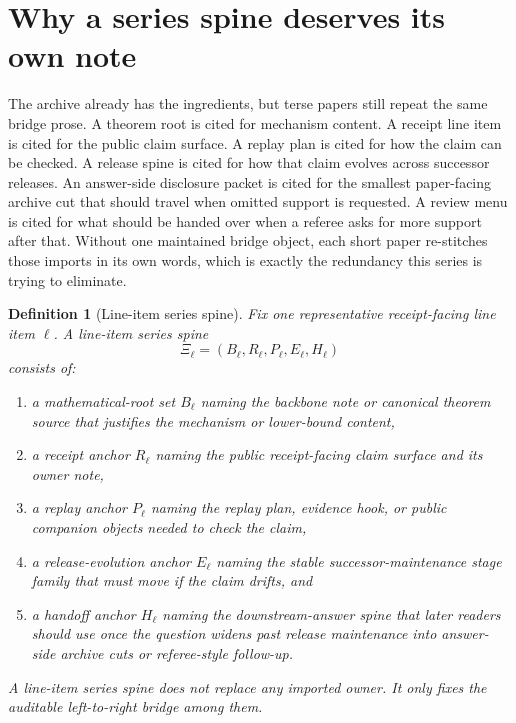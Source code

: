 \documentclass[11pt]{article}
\newtheorem{definition}{Definition}
\begin{document}
\section{Why a series spine deserves its own note}
The archive already has the ingredients, but terse papers still repeat the same bridge prose.
A theorem root is cited for mechanism content.
A receipt line item is cited for the public claim surface.
A replay plan is cited for how the claim can be checked.
A release spine is cited for how that claim evolves across successor releases.
An answer-side disclosure packet is cited for the smallest paper-facing archive cut that should travel when omitted support is requested.
A review menu is cited for what should be handed over when a referee asks for more support after that.
Without one maintained bridge object, each short paper re-stitches those imports in its own words, which is exactly the redundancy this series is trying to eliminate.

\begin{definition}[Line-item series spine]
Fix one representative receipt-facing line item $\ell$.
A \emph{line-item series spine}
\[
\Xi_{\ell}=(B_{\ell},R_{\ell},P_{\ell},E_{\ell},H_{\ell})
\]
consists of:
\begin{enumerate}[leftmargin=*]
\item a mathematical-root set $B_{\ell}$ naming the backbone note or canonical theorem source that justifies the mechanism or lower-bound content,
\item a receipt anchor $R_{\ell}$ naming the public receipt-facing claim surface and its owner note,
\item a replay anchor $P_{\ell}$ naming the replay plan, evidence hook, or public companion objects needed to check the claim,
\item a release-evolution anchor $E_{\ell}$ naming the stable successor-maintenance stage family that must move if the claim drifts, and
\item a handoff anchor $H_{\ell}$ naming the downstream-answer spine that later readers should use once the question widens past release maintenance into answer-side archive cuts or referee-style follow-up.
\end{enumerate}
A line-item series spine does not replace any imported owner.
It only fixes the auditable left-to-right bridge among them.
\end{definition}
\end{document}
